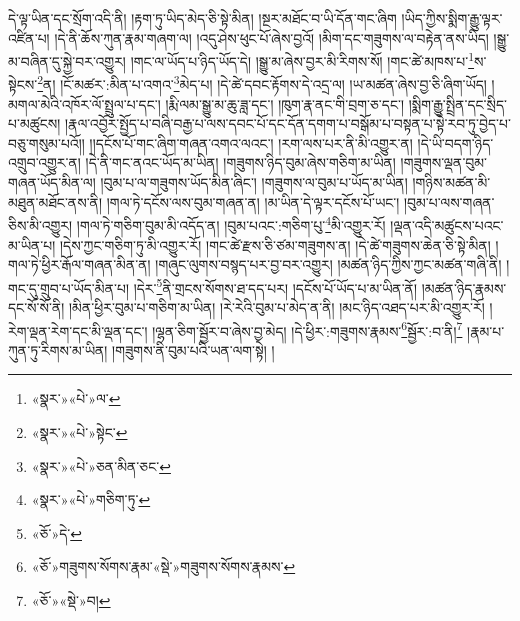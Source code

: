 དེ་ལྟ་ཡིན་དང་སྲོག་འདི་ནི། །རྟག་ཏུ་ཡིད་མེད་ཅི་སྟེ་མིན། །སྔར་མཐོང་བ་ཡི་དོན་གང་ཞིག །ཡིད་ཀྱིས་སྨིག་རྒྱུ་ལྟར་འཛིན་པ། །དེ་ནི་ཆོས་ཀུན་རྣམ་གཞག་ལ། །འདུ་ཤེས་ཕུང་པོ་ཞེས་བྱའོ། །མིག་དང་གཟུགས་ལ་བརྟེན་ནས་ཡིད། །སྒྱུ་མ་བཞིན་དུ་སྐྱེ་བར་འགྱུར། །གང་ལ་ཡོད་པ་ཉིད་ཡོད་དེ། །སྒྱུ་མ་ཞེས་བྱར་མི་རིགས་སོ། །གང་ཚེ་མཁས་པ་\footnote{«སྣར་»«པེ་»ལ་}ས་སྟེངས་\footnote{«སྣར་»«པེ་»སྟེང་}ན། །ངོ་མཚར་:མིན་པ་འགའ་\footnote{«སྣར་»«པེ་»ཅན་མིན་ཅང་}མེད་པ། །དེ་ཚེ་དབང་རྟོགས་དེ་འདྲ་ལ། །ཡ་མཚན་ཞེས་བྱ་ཅི་ཞིག་ཡོད། །མགལ་མེའི་འཁོར་ལོ་སྤྲུལ་པ་དང་། །རྨི་ལམ་སྒྱུ་མ་ཆུ་ཟླ་དང་། །ཁུག་རྣ་ནང་གི་བྲག་ཅ་དང་། །སྨིག་རྒྱུ་སྤྲིན་དང་སྲིད་པ་མཚུངས། །རྣལ་འབྱོར་སྤྱོད་པ་བཞི་བརྒྱ་པ་ལས་དབང་པོ་དང་དོན་དགག་པ་བསྒོམ་པ་བསྟན་པ་སྟེ་རབ་ཏུ་བྱེད་པ་བཅུ་གསུམ་པའོ།། །།དངོས་པོ་གང་ཞིག་གཞན་འགའ་ལའང་། །རག་ལས་པར་ནི་མི་འགྱུར་ན། །དེ་ཡི་བདག་ཉིད་འགྲུབ་འགྱུར་ན། །དེ་ནི་གང་ནའང་ཡོད་མ་ཡིན། །གཟུགས་ཉིད་བུམ་ཞེས་གཅིག་མ་ཡིན། །གཟུགས་ལྡན་བུམ་གཞན་ཡོད་མིན་ལ། །བུམ་པ་ལ་གཟུགས་ཡོད་མིན་ཞིང་། །གཟུགས་ལ་བུམ་པ་ཡོད་མ་ཡིན། །གཉིས་མཚན་མི་མཐུན་མཐོང་ནས་ནི། །གལ་ཏེ་དངོས་ལས་བུམ་གཞན་ན། །མ་ཡིན་དེ་ལྟར་དངོས་པོ་ཡང་། །བུམ་པ་ལས་གཞན་ཅིས་མི་འགྱུར། །གལ་ཏེ་གཅིག་བུམ་མི་འདོད་ན། །བུམ་པའང་:གཅིག་པུ་\footnote{«སྣར་»«པེ་»གཅིག་ཏུ་}མི་འགྱུར་རོ། །ལྡན་འདི་མཚུངས་པའང་མ་ཡིན་པ། །དེས་ཀྱང་གཅིག་ཏུ་མི་འགྱུར་རོ། །གང་ཚེ་རྫས་ཅི་ཙམ་གཟུགས་ན། །དེ་ཚེ་གཟུགས་ཆེན་ཅི་སྟེ་མིན། །གལ་ཏེ་ཕྱིར་རྒོལ་གཞན་མིན་ན། །གཞུང་ལུགས་བསྙད་པར་བྱ་བར་འགྱུར། །མཚན་ཉིད་ཀྱིས་ཀྱང་མཚན་གཞི་ནི། །གང་དུ་གྲུབ་པ་ཡོད་མིན་པ། །དེར་\footnote{«ཅོ་»དེ་}ནི་གྲངས་སོགས་ཐ་དད་པར། །དངོས་པོ་ཡོད་པ་མ་ཡིན་ནོ། །མཚན་ཉིད་རྣམས་དང་སོ་སོ་ནི། །མིན་ཕྱིར་བུམ་པ་གཅིག་མ་ཡིན། །རེ་རེའི་བུམ་པ་མེད་ན་ནི། །མང་ཉིད་འཐད་པར་མི་འགྱུར་རོ། །རེག་ལྡན་རེག་དང་མི་ལྡན་དང་། །ལྷན་ཅིག་སྦྱོར་བ་ཞེས་བྱ་མེད། །དེ་ཕྱིར་:གཟུགས་རྣམས་\footnote{«ཅོ་»གཟུགས་སོགས་རྣམ་«སྡེ་»གཟུགས་སོགས་རྣམས་}སྦྱོར་:བ་ནི།\footnote{«ཅོ་»«སྡེ་»བ།} །རྣམ་པ་ཀུན་ཏུ་རིགས་མ་ཡིན། །གཟུགས་ནི་བུམ་པའི་ཡན་ལག་སྟེ། །
